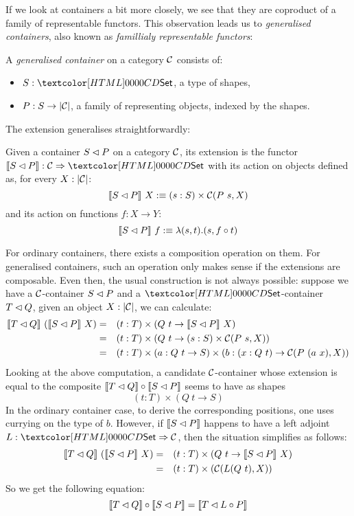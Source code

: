 If we look at containers a bit more closely, we see that they are
coproduct of a family of representable functors. This observation
leads us to \emph{generalised containers}, also known as
\emph{famillialy representable functors}:
%
\begin{definition}
  A \emph{generalised container} on a category $\mathcal{C}$ consists of:
  \begin{itemize}
  \item $S : \Set$, a type of shapes,
  \item $P : S \to | \mathcal{C} |$, a family of representing objects, indexed
    by the shapes.
  \end{itemize}
\end{definition}
%
The extension generalises straightforwardly:
%
\begin{definition}
  Given a container $S \lhd P$ on a category $\mathcal{C}$, its extension
  is the functor $\context{\cont{S}{P}} : \Func{\Cc}{\Set}$ with its
  action on objects defined as, for every $X : | \mathcal{C} |$:
  $$
  \llbracket S \lhd P \rrbracket\ X :\equiv (s : S) \times \mathcal{C}(P\ s, X)
  $$
  and its action on functions $f : X \to Y$:
  $$
  \llbracket S \lhd P \rrbracket\ f :\equiv \lambda (s , t) . (s , f \circ t)
  $$
\end{definition}
%
For ordinary containers, there exists a composition operation on
them. For generalised containers, such an operation only makes sense
if the extensions are composable. Even then, the usual construction is
not always possible: suppose we have a $\mathcal{C}$-container $S \lhd P$
and a $\Set$-container $T \lhd Q$, given an object $X : | \mathcal{C} |$, we can calculate:
\begin{align*}
  \context{\cont{T}{Q}}\ (\context{\cont{S}{P}}\ X) &=& &(t : T) \times (Q\ t \to \context{\cont{S}{P}}\ X) \\
  &=& &(t : T) \times (Q\ t \to (s : S) \times \Cc(P\ s, X)) \\
  &=& &(t : T) \times (a : Q\ t \to S) \times (b : (x : Q\ t) \to \Cc(P\ (a\ x), X))
\end{align*}
Looking at the above computation, a candidate $\mathcal{C}$-container whose
extension is equal to the composite
$\llbracket T \lhd Q \rrbracket \circ \llbracket S \lhd P \rrbracket$ seems to have as shapes
$$
(t : T) \times (Q\ t \to S)
$$
In the ordinary container case, to derive the corresponding positions,
one uses currying on the type of $b$. However, if
$\llbracket S \lhd P \rrbracket$ happens to have a left adjoint
$L : \Func{\Set}{\Cc}$, then the situation simplifies as follows:
\begin{align*}
  \llbracket T \lhd Q \rrbracket\ (\llbracket S \lhd P \rrbracket\ X) &=& &(t : T) \times (Q\ t \to \llbracket S \lhd P \rrbracket\ X) \\
  &=& &(t : T) \times (\mathcal{C}(L (Q\ t), X)) \\
\end{align*}
So we get the following equation:
$$
\llbracket T \lhd Q \rrbracket \circ \llbracket S \lhd P \rrbracket = \llbracket T \lhd L \circ P \rrbracket
$$

